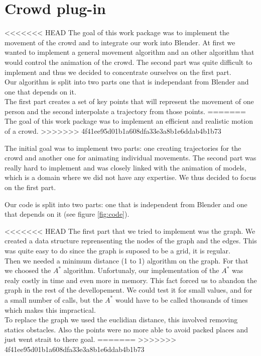 \section{Crowd plug-in}

<<<<<<< HEAD
The goal of this work package was to implement the movement of the crowd and to integrate our work into Blender. At first we wanted to implement a general movement algorithm and an other algorithm that would control the animation of the crowd. The second part was quite difficult to implement and thus we decided to concentrate ourselves on the first part.\\
Our algorithm is split into two parts one that is independant from Blender and one that depends on it. \\
The first part creates a set of key points that will represent the movement of one person and the second interpolate a trajectory from those points.
=======
The goal of this work package was to implement an efficient and
realistic motion of a crowd.
>>>>>>> 4f41ee95d01b1a608dfa33e3a8b1e6ddab4b1b73


The initial goal was to implement two parts: one creating trajectories
for the crowd and another one for animating individual movements. The
second part was really hard to implement and was closely linked with
the animation of models, which is a domain where we did not have any
expertise. We thus decided to focus on the first part.


Our code is split into two parts: one that is independent from Blender
and one that depends on it (see figure \ref{fig:code}).

<<<<<<< HEAD
The first part that we tried to implement was the graph. We created a data structure reprensenting the nodes of the graph and the edges. This was quite easy to do since the graph is suposed to be a grid, it is regular.\\
Then we needed a minimum distance (1 to 1) algorithm on the graph. For that we choosed the $A^*$ algorithm. Unfortunaly, our implementation of the $A^*$ was realy costly in time and even more in memory. This fact forced us to abandon the graph in the rest of the devellopement. We could test it for small values, and for a small number of calls, but the $A^*$ would have to be called thousands of times which makes this impractical.\\ 
To replace the graph we used the euclidian distance, this involved removing statics obstacles. Also the points were no more able to avoid packed places and just went strait to there goal.
=======
>>>>>>> 4f41ee95d01b1a608dfa33e3a8b1e6ddab4b1b73

